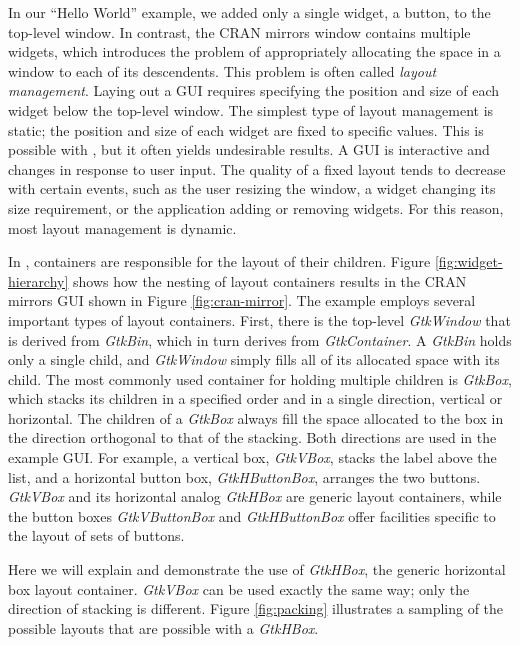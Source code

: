 \documentclass[article]{jss}
\begin{document}
In our ``Hello World'' example, we added only a single widget, a button, to the 
top-level window. In contrast, the CRAN mirrors window contains multiple 
widgets, which introduces the problem of appropriately allocating the space in a
window to each of its descendents. This problem is often called \emph{layout management}.
Laying out a GUI requires specifying the position and size of each widget below
the top-level window. The simplest type of layout management is static; the
position and size of each widget are fixed to specific values. This is possible
with , but it often yields undesirable results. A GUI is interactive 
and changes in response to user input. The quality of a fixed layout tends to decrease
with certain events, such as the user resizing
the window, a widget changing its size requirement, or the application
adding or removing widgets. For this reason, most layout management is dynamic.

In , containers are responsible for the layout
of their children. Figure \ref{fig:widget-hierarchy} shows how the nesting of 
layout containers results in the CRAN mirrors GUI shown in Figure 
\ref{fig:cran-mirror}. The example employs several important types of 
layout containers. First, there is the top-level \emph{GtkWindow} that
is derived from \emph{GtkBin}, which in turn derives from \emph{GtkContainer}.
A \emph{GtkBin} holds only a single child, and \emph{GtkWindow} simply fills all
of its allocated space with its child. The most commonly used container
for holding multiple children is \emph{GtkBox}, which stacks its children
in a specified order and in a single direction, vertical or horizontal. The 
children of a \emph{GtkBox} always fill the space allocated to the box in 
the direction orthogonal to that of the stacking. Both
directions are used in the example GUI. For example, a vertical box, \emph{GtkVBox},
stacks the label above the list, and a horizontal button box, \emph{GtkHButtonBox},
arranges the two buttons. \emph{GtkVBox} and its horizontal analog \emph{GtkHBox}
are generic layout containers, while the button boxes \emph{GtkVButtonBox} and 
\emph{GtkHButtonBox} offer facilities specific to the layout of sets of buttons.

Here we will explain and demonstrate the use of \emph{GtkHBox}, the generic
horizontal box layout container. \emph{GtkVBox} can be used exactly the same way;
only the direction of stacking is different. Figure \ref{fig:packing} illustrates
a sampling of the possible layouts that are possible with a \emph{GtkHBox}.
\end{document}

